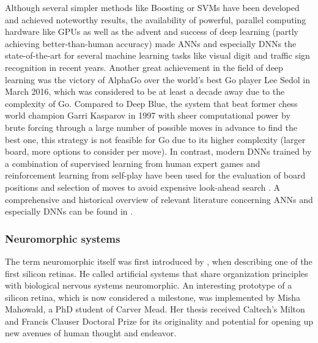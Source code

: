 Although several simpler methods like Boosting \parencite{Freund1997} or \acp{SVM} \parencite{Vapnik1995} have been developed and achieved noteworthy results, the availability of powerful, parallel computing hardware like \acp{GPU} as well as the advent and success  of deep learning (partly achieving better-than-human accuracy) made \acp{ANN} \parencite{Rojas1996} and especially \acp{DNN} \parencite{LeCun2015} the state-of-the-art for several machine learning tasks like visual digit \parencite{Ciresan2012a} and traffic sign \parencite{Ciresan2012} recognition in recent years.
Another great achievement in the field of deep learning was the victory of AlphaGo \parencite{Silver2016} over the world's best Go player Lee Sedol in March 2016, which was considered to be at least a decade away due to the complexity of Go.
Compared to Deep Blue, the system that beat former chess world champion Garri Kasparov in 1997 \parencite{Hsu2002} with sheer computational power by brute forcing through a large number of possible moves in advance to find the best one, this strategy is not feasible for Go due to its higher complexity (larger board, more options to consider per move).
In contrast, modern \acp{DNN} trained by a combination of supervised learning from human expert games and reinforcement learning from self-play have been used for the evaluation of board positions and selection of moves to avoid expensive look-ahead search \parencite{Silver2016}.
A comprehensive and historical overview of relevant literature concerning \acp{ANN} and especially \acp{DNN} can be found in \textcite{Schmidhuber2015, LeCun2015}.

\subsubsection{Neuromorphic systems}

The term neuromorphic itself was first introduced by \textcite{Mead90}, when describing one of the first silicon retinas.
He called artificial systems that share organization principles with biological nervous systems neuromorphic.
An interesting prototype of a silicon retina, which is now considered a milestone, was implemented by Misha Mahowald, a PhD student of Carver Mead.
Her thesis received Caltech's Milton and Francis Clauser Doctoral Prize for its originality and potential for opening up new avenues of human thought and endeavor.

